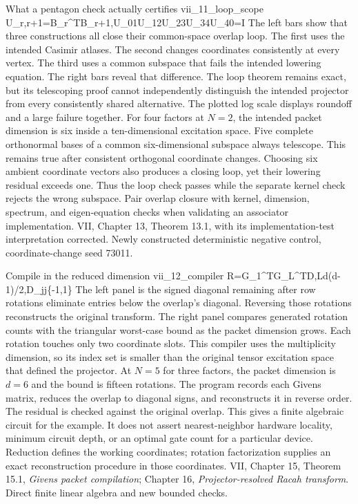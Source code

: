 {What a pentagon check actually certifies}
{vii_11_loop_scope}
{U_{r,r+1}=B_r^{\mathsf T}B_{r+1},\qquad U_{01}U_{12}U_{23}U_{34}U_{40}=I}
{The left bars show that three constructions all close their common-space overlap loop. The first uses the intended Casimir atlases. The second changes coordinates consistently at every vertex. The third uses a common subspace that fails the intended lowering equation. The right bars reveal that difference. The loop theorem remains exact, but its telescoping proof cannot independently distinguish the intended projector from every consistently shared alternative. The plotted log scale displays roundoff and a large failure together.}
{For four factors at $N=2$, the intended packet dimension is six inside a ten-dimensional excitation space. Five complete orthonormal bases of a common six-dimensional subspace always telescope. This remains true after consistent orthogonal coordinate changes. Choosing six ambient coordinate vectors also produces a closing loop, yet their lowering residual exceeds one. Thus the loop check passes while the separate kernel check rejects the wrong subspace.}
{Pair overlap closure with kernel, dimension, spectrum, and eigen-equation checks when validating an associator implementation.}
{VII, Chapter 13, Theorem 13.1, with its implementation-test interpretation corrected. Newly constructed deterministic negative control, coordinate-change seed 73011.}

{Compile in the reduced dimension}
{vii_12_compiler}
{\mathcal R=G_1^{\mathsf T}\cdots G_L^{\mathsf T}D,\qquad L\leq d(d-1)/2,\qquad D_{jj}\in\{-1,1\}}
{The left panel is the signed diagonal remaining after row rotations eliminate entries below the overlap's diagonal. Reversing those rotations reconstructs the original transform. The right panel compares generated rotation counts with the triangular worst-case bound as the packet dimension grows. Each rotation touches only two coordinate slots. This compiler uses the multiplicity dimension, so its index set is smaller than the original tensor excitation space that defined the projector.}
{At $N=5$ for three factors, the packet dimension is $d=6$ and the bound is fifteen rotations. The program records each Givens matrix, reduces the overlap to diagonal signs, and reconstructs it in reverse order. The residual is checked against the original overlap. This gives a finite algebraic circuit for the example. It does not assert nearest-neighbor hardware locality, minimum circuit depth, or an optimal gate count for a particular device.}
{Reduction defines the working coordinates; rotation factorization supplies an exact reconstruction procedure in those coordinates.}
{VII, Chapter 15, Theorem 15.1, \emph{Givens packet compilation}; Chapter 16, \emph{Projector-resolved Racah transform}. Direct finite linear algebra and new bounded checks.}

